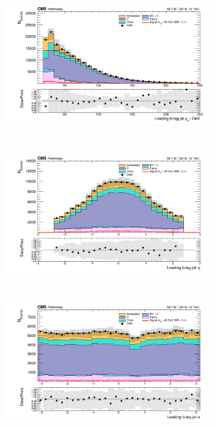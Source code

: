 \begin{figure}[ht]
    \centering
    \begin{subfigure}{0.75\textwidth}
        \includegraphics[width=1.0\textwidth]{figures/ch-11-asymmetric/mutau_bpt_deepflavour_1.png}
    \end{subfigure} \\
    \begin{subfigure}{0.75\textwidth}
        \includegraphics[width=1.0\textwidth]{figures/ch-11-asymmetric/mutau_beta_deepflavour_1.png}
    \end{subfigure} \\
    \begin{subfigure}{0.75\textwidth}
        \includegraphics[width=1.0\textwidth]{figures/ch-11-asymmetric/mutau_bphi_deepflavour_1.png}

\end{subfigure}
\end{figure}
